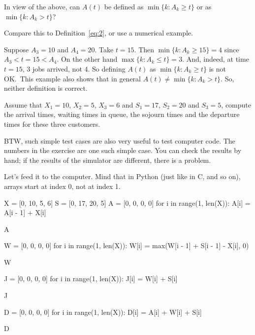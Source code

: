 \begin{exercise}\label{ex:22}
 In  view of the above, can $A(t)$ be defined as $\min\{k : A_k \geq t\}$ or as $\min\{k: A_k > t\}$?
\begin{hint}
Compare this to Definition~\cref{eq:2}, or use a numerical example.
\end{hint}
\begin{solution}
  Suppose $A_3 = 10$ and $A_4 = 20$.
  Take $t=15$.
  Then $\min\{k : A_k \geq 15\} = 4$ since $A_3 < t=15 < A_4$.
  On the other hand $\max\{k : A_k \leq t\} = 3$.
  And, indeed, at time $t=15$, 3 jobs arrived, not 4.
  So defining $A(t)$ as $\min\{k : A_k \geq t\}$ is not OK.\
  This example also shows that in general $A(t) \neq \min\{k : A_k > t\}$.
  So, neither definition is correct.
\end{solution}
\end{exercise}



\begin{exercise}\label{ex:82}
 Assume  that $X_1=10$, $X_2=5$, $X_3=6$ and $S_1 = 17$, $S_2=20$ and $S_3=5$, compute the arrival times, waiting times in queue, the sojourn times and the departure times for these three customers.
\begin{hint}

 BTW, such simple test cases are also very useful to test computer code.
 The numbers in the exercise are one such simple case.
 You can check the results by hand; if the results of the simulator are different, there is a problem.
\end{hint}
\begin{solution} Let's feed it to the computer. Mind that in Python (just like in C, and so on), arrays start at index 0, not at index 1.
\begin{pyconsole}
X = [0, 10, 5, 6]
S = [0, 17, 20, 5]
A = [0, 0, 0, 0]
for i in range(1, len(X)):
    A[i] = A[i - 1] + X[i]

A

W = [0, 0, 0, 0]
for i in range(1, len(X)):
    W[i] = max(W[i - 1] + S[i - 1] - X[i], 0)

W

J = [0, 0, 0, 0]
for i in range(1, len(X)):
    J[i] = W[i] + S[i]

J

D = [0, 0, 0, 0]
for i in range(1, len(X)):
    D[i] = A[i] + W[i] + S[i]

D
\end{pyconsole}

\end{solution}
\end{exercise}




